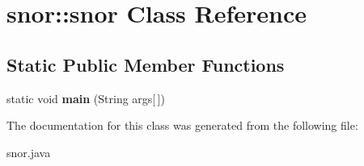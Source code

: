 \hypertarget{classsnor_1_1snor}{
\section{snor::snor Class Reference}
\label{classsnor_1_1snor}
}
\subsection*{Static Public Member Functions}
\begin{DoxyCompactItemize}
\item 
\hypertarget{classsnor_1_1snor_a96d8a338b97a38d8d21323921f61bb81}{
static void {\bfseries main} (String args\mbox{[}$\,$\mbox{]})}
\label{classsnor_1_1snor_a96d8a338b97a38d8d21323921f61bb81}

\end{DoxyCompactItemize}


The documentation for this class was generated from the following file:\begin{DoxyCompactItemize}
\item 
snor.java\end{DoxyCompactItemize}
